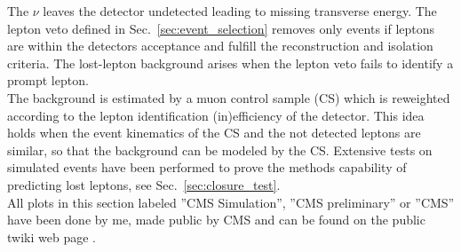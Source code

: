 The $\nu$ leaves the detector undetected leading to missing transverse energy. The lepton veto defined in Sec.~\ref{sec:event_selection} removes only events if leptons are within the detectors acceptance and fulfill the reconstruction and isolation criteria. The lost-lepton background arises when the lepton veto fails to identify a prompt lepton.\\
The background is estimated by a muon control sample (CS) which is reweighted according to the lepton identification (in)efficiency of the detector.
This idea holds when the event kinematics of the CS and the not detected leptons are similar, so that the background can be modeled by the CS. Extensive tests on simulated events have been performed to prove the methods capability of predicting lost leptons, see Sec.~\ref{sec:closure_test}.\\
All plots in this section labeled ''CMS Simulation'', ''CMS preliminary'' or ''CMS'' have been done by me, made public by CMS and can be found on the public twiki web page \cite{bib:TWiki:SUS12011}.

